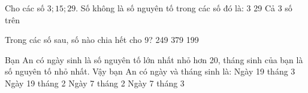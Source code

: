 \documentclass[12pt,a4paper]{article}
\begin{document}
\begin{ex}
Cho các số $3; 15; 29$. Số không là số nguyên tố trong các số đó là:
\choice
{3}
{}
{29}
{Cả 3 số trên}
\end{ex}

\begin{ex}
Trong các số sau, số nào chia hết cho 9?
\choice
{}
{249}
{379}
{199}
\end{ex}

\begin{ex}
Bạn An có ngày sinh là số nguyên tố lớn nhất nhỏ hơn 20, tháng sinh của bạn là số nguyên tố nhỏ nhất. Vậy bạn An có ngày và tháng sinh là:
\choice
{Ngày 19 tháng 3}
{\True Ngày 19 tháng 2}
{Ngày 7 tháng 2}
{Ngày 7 tháng 3}
\end{ex}
\end{document}
